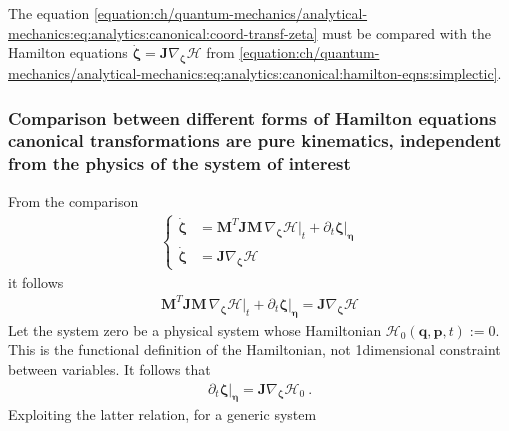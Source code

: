 \documentclass[letterpaper,10pt,english]{jupyterBook}
\begin{document}
\sphinxAtStartPar
The equation \eqref{equation:ch/quantum-mechanics/analytical-mechanics:eq:analytics:canonical:coord-transf-zeta} must be compared with the Hamilton equations \(\dot{\boldsymbol{\zeta}} = \mathbf{J} \nabla_{\boldsymbol\zeta} \mathscr{H}\) from \eqref{equation:ch/quantum-mechanics/analytical-mechanics:eq:analytics:canonical:hamilton-eqns:simplectic}.
\subsubsection*{Comparison between different forms of Hamilton equations \sphinxhyphen{} canonical transformations are pure kinematics, independent from the physics of the system of interest}

\sphinxAtStartPar
From the comparison
\begin{equation*}
\begin{split}\left\{
\begin{aligned}
 \dot{\boldsymbol{\zeta}}
 & = \mathbf{M}^T \mathbf{J} \mathbf{M} \, \nabla_{\boldsymbol\zeta} \left.\mathcal{H}\right|_t + \partial_t \boldsymbol\zeta|_{\boldsymbol\eta} \\
 \dot{\boldsymbol{\zeta}} & = \mathbf{J} \nabla_{\boldsymbol\zeta} \mathscr{H}
\end{aligned}
\right.\end{split}
\end{equation*}
\sphinxAtStartPar
it follows
\begin{equation*}
\begin{split}
 \mathbf{M}^T \mathbf{J} \mathbf{M} \, \nabla_{\boldsymbol\zeta} \left.\mathcal{H}\right|_t + \partial_t \boldsymbol\zeta|_{\boldsymbol\eta}
 = \mathbf{J} \nabla_{\boldsymbol\zeta} \mathscr{H}
\end{split}
\end{equation*}
\sphinxAtStartPar
{} Let the system zero be a physical system whose Hamiltonian \(\mathcal{H}_0(\mathbf{q}, \mathbf{p}, t) := 0\).  This is the functional definition of the Hamiltonian, not 1\sphinxhyphen{}dimensional constraint between variables. It follows that
\begin{equation*}
\begin{split}
 \partial_t \boldsymbol\zeta|_{\boldsymbol\eta} = \mathbf{J} \nabla_{\boldsymbol\zeta} \mathscr{H}_0 \ .
\end{split}
\end{equation*}
\sphinxAtStartPar
{} Exploiting the latter relation, for a generic system
\end{document}
